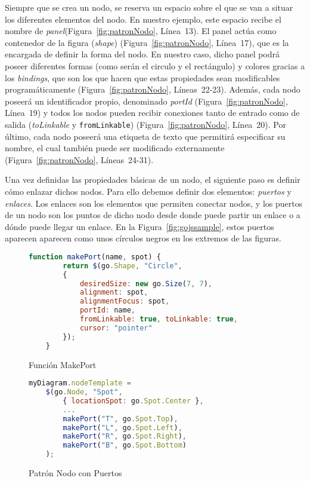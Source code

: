 Siempre que se crea un nodo, se reserva un espacio sobre el que se van a situar los diferentes elementos del nodo. En nuestro ejemplo, este espacio recibe el nombre de \emph{panel}(Figura~\ref{fig:patronNodo}, Línea~13). El panel actúa como contenedor de la figura (\emph{shape}) (Figura~\ref{fig:patronNodo}, Línea~17), que es la encargada de definir la forma del nodo. En nuestro caso, dicho panel podrá poseer diferentes formas (como serán el circulo y el rectángulo) y colores gracias a los \emph{bindings}, que son los que hacen que estas propiedades sean modificables programáticamente (Figura~\ref{fig:patronNodo}, Líneas~22-23). Además, cada nodo poseerá un identificador propio, denominado \emph{portId} (Figura~\ref{fig:patronNodo}, Línea~19) y todos los nodos pueden recibir conexiones tanto de entrado como de salida (\emph{toLinkable} y \texttt{fromLinkable}) (Figura~\ref{fig:patronNodo}, Línea~20). Por último, cada nodo poseerá una etiqueta de texto que permitirá especificar su nombre, el cual también puede ser modificado externamente (Figura~\ref{fig:patronNodo}, Líneas~24-31).

Una vez definidas las propiedades básicas de un nodo, el siguiente paso es definir cómo enlazar dichos nodos. Para ello debemos definir dos elementos: \emph{puertos} y \emph{enlaces}. Los enlaces son los elementos que permiten conectar nodos, y los puertos de un nodo son los puntos de dicho nodo desde donde puede partir un enlace o a dónde puede llegar un enlace.  En la Figura~\ref{fig:gojssample}, estos puertos aparecen aparecen como unos círculos negros en los extremos de las figuras.

\begin{figure}[H]
	\centering
	\begin{lstlisting}[language=JavaScript]
	function makePort(name, spot) {
		return $(go.Shape, "Circle",
		{
			desiredSize: new go.Size(7, 7),
			alignment: spot,
			alignmentFocus: spot,
			portId: name,
			fromLinkable: true, toLinkable: true,
			cursor: "pointer"
		});
	}\end{lstlisting}
	\caption{Función MakePort}
	\label{fig:funcionMakeport}
\end{figure}

\begin{figure}[H]
	\centering
	\begin{lstlisting}[language=JavaScript]
	myDiagram.nodeTemplate =
	$(go.Node, "Spot",
		{ locationSpot: go.Spot.Center },
		...
		makePort("T", go.Spot.Top),
		makePort("L", go.Spot.Left),
		makePort("R", go.Spot.Right),
		makePort("B", go.Spot.Bottom)
	);\end{lstlisting}
	\caption{Patrón Nodo con Puertos}
	\label{fig:patronNodoFinal}
\end{figure}

